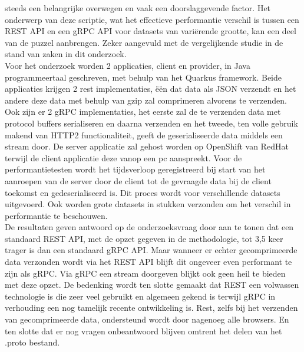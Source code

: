 steeds een belangrijke overwegen en vaak een doorslaggevende factor.
Het onderwerp van deze scriptie, wat het effectieve performantie verschil is tussen een REST API en een gRPC API voor
datasets van variërende grootte, kan een deel van de puzzel aanbrengen. Zeker aangevuld met de vergelijkende studie in de stand van zaken in dit onderzoek.\\
Voor het onderzoek worden 2 applicaties, client en provider, in Java programmeertaal geschreven, met behulp van het Quarkus framework.
Beide applicaties krijgen 2 rest implementaties, \"e\"en dat data als JSON verzendt en het andere deze data met behulp van gzip zal comprimeren alvorens te verzenden.
Ook zijn er 2 gRPC implementaties, het eerste zal de te verzenden data met protocol buffers serialiseren en daarna verzenden en het tweede,
ten volle gebruik makend van HTTP2 functionaliteit, geeft de geserialiseerde data middels een stream door.
De server applicatie zal gehost worden op OpenShift van RedHat terwijl de client applicatie deze vanop een pc aanspreekt.
Voor de performantietesten wordt het tijdsverloop geregistreerd bij start van het aanroepen van de server door de client
tot de gevraagde data bij de client toekomst en gedeserialiseerd is. Dit proces wordt voor verschillende datasets uitgevoerd.
Ook worden grote datasets in stukken verzonden om het verschil in performantie te beschouwen.\\
De resultaten geven antwoord op de onderzoeksvraag door aan te tonen dat een standaard REST API, met de opzet gegeven in de methodologie,
tot 3,5 keer trager is dan een standaard gRPC API. Maar wanneer er echter gecomprimeerde data verzonden wordt via het REST API blijft dit ongeveer even performant te zijn als gRPC.
Via gRPC een stream doorgeven blijkt ook geen heil te bieden met deze opzet.
De bedenking wordt ten slotte gemaakt dat REST een volwassen technologie is die zeer veel gebruikt en algemeen gekend is terwijl gRPC in verhouding een nog tamelijk recente ontwikkeling is.
Rest, zelfs bij het verzenden van gecomprimeerde data, ondersteund wordt door nagenoeg alle browsers. En ten slotte dat er nog vragen onbeantwoord blijven omtrent het delen van het .proto bestand.